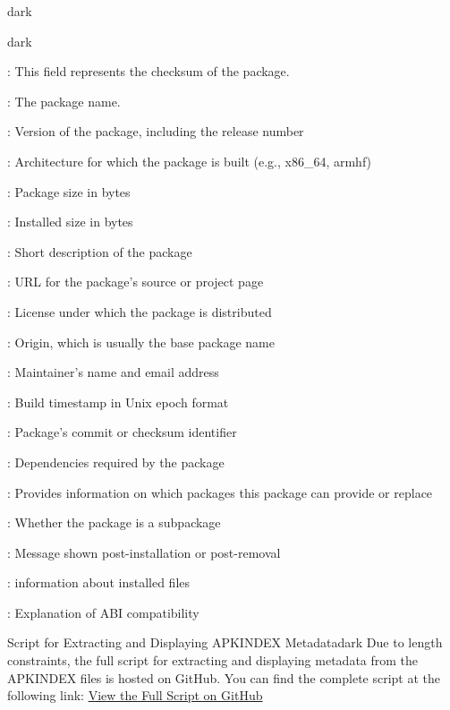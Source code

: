 \begin{baseBoxThree}{}{dark}
    \smallskip
    \begin{baseBoxThree}{}{dark}
        \begin{posnexItemize}
            \item[\sA] : This field represents the checksum of the package.
            \item[\sA] : The package name.
            \item[\sA] : Version of the package, including the release number
            \item[\sA] : Architecture for which the package is built (e.g., x86\_64, armhf)
            \item[\sA] : Package size in bytes
            \item[\sA] : Installed size in bytes
            \item[\sA] : Short description of the package
            \item[\sA] : URL for the package's source or project page
            \item[\sA] : License under which the package is distributed
            \item[\sA] : Origin, which is usually the base package name
            \item[\sA] : Maintainer's name and email address
            \item[\sA] : Build timestamp in Unix epoch format
            \item[\sA] : Package's commit or checksum identifier
            \item[\sA] : Dependencies required by the package
            \item[\sA] : Provides information on which packages this package can provide or replace
            \item[\sA] : Whether the package is a subpackage
            \item[\sA] : Message shown post-installation or post-removal
            \item[\sA] : information about installed files
            \item[\sA] : Explanation of ABI compatibility            
        \end{posnexItemize}
    \end{baseBoxThree}
    \smallskip
    \begin{baseBoxThree}{Script for Extracting and Displaying APKINDEX Metadata}{dark}
        \smallskip
        Due to length constraints, the full script for extracting and displaying metadata from the APKINDEX files is hosted on GitHub. You can find the complete script at the following link:
        \href{https://github.com/Canine-Table/Alpine-Linux-Containers/blob/main/scripts/shell/apk-query.sh}{View the Full Script on GitHub}
        \smallskip
    \end{baseBoxThree}
    \smallskip
\end{baseBoxThree}

